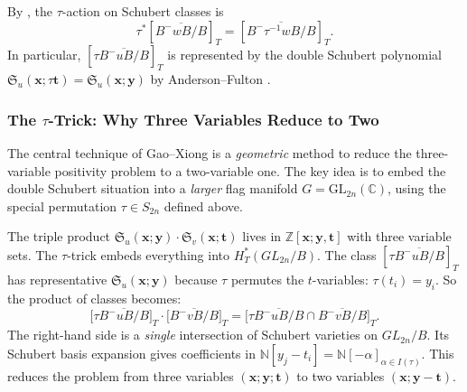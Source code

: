 By \cite[Equation (16.5)]{AndersonFulton}, the $\tau$-action on Schubert classes is
\begin{equation}
\tau^*\!\left[\overline{B^-wB/B}\right]_T = \left[\overline{B^-\tau^{-1}wB/B}\right]_T.
\label{eq:TauPullbackSchubert}
\end{equation}
In particular, $[\tau\overline{B^-uB/B}]_T$ is represented by the double Schubert polynomial $\mathfrak{S}_u(\mathbf{x};\tau\mathbf{t}) = \mathfrak{S}_u(\mathbf{x};\mathbf{y})$ by Anderson--Fulton \cite[Section 16.5]{AndersonFulton}.

\bigskip

\subsubsection{The $\tau$-Trick: Why Three Variables Reduce to Two}
\label{sec:TauTrickWhy3to2}

The central technique of Gao--Xiong \cite{GX2025} is a \emph{geometric} method to reduce the three-variable positivity problem to a two-variable one. The key idea is to embed the double Schubert situation into a \emph{larger} flag manifold $G = \mathrm{GL}_{2n}(\mathbb{C})$, using the special permutation $\tau \in S_{2n}$ defined above.

\medskip
\begin{Remark}\label{rmk:WhyTauTrick}
The triple product $\mathfrak{S}_u(\mathbf{x};\mathbf{y}) \cdot \mathfrak{S}_v(\mathbf{x};\mathbf{t})$ lives in $\mathbb{Z}[\mathbf{x};\mathbf{y},\mathbf{t}]$ with three variable sets. The $\tau$-trick embeds everything into $H_T^*(GL_{2n}/B)$. The class $[\tau\overline{B^-uB/B}]_T$ has representative $\mathfrak{S}_u(\mathbf{x};\mathbf{y})$ because $\tau$ permutes the $t$-variables: $\tau(t_i) = y_i$. So the product of classes becomes:
\begin{equation}
\bigl[\tau\overline{B^-uB/B}\bigr]_T \cdot \bigl[\overline{B^-vB/B}\bigr]_T = \bigl[\tau\overline{B^-uB/B} \cap \overline{B^-vB/B}\bigr]_T.
\label{eq:TauIntersectionClass}
\end{equation}
The right-hand side is a \emph{single} intersection of Schubert varieties on $GL_{2n}/B$. Its Schubert basis expansion gives coefficients in $\mathbb{N}[y_j-t_i] = \mathbb{N}[-\alpha]_{\alpha\in I(\tau)}$. This reduces the problem from three variables $(\mathbf{x};\mathbf{y};\mathbf{t})$ to two variables $(\mathbf{x};\mathbf{y}-\mathbf{t})$.
\end{Remark}

